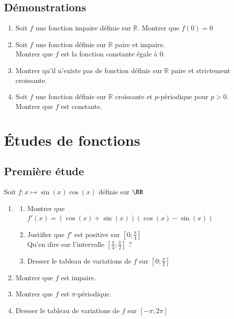 \documentclass[oneside,12pt]{article}          %
\begin{document}
\subsection{Démonstrations}
\begin{enumerate}
    \item Soit $ f $ une fonction impaire définie sur $ \mathbb{R} $. Montrer que $ f(0) = 0 $
    \item Soit $ f $ une fonction définie sur $ \mathbb{R} $ paire et impaire.\\
    Montrer que $ f $ est la fonction constante égale à 0.
    \item Montrer qu'il n'existe pas de fonction définie sur $ \mathbb{R} $ paire et strictement croissante.
    \item Soit $ f $ une fonction définie sur $ \mathbb{R} $ croissante et $ p $-périodique pour $ p > 0 $.\\
    Montrer que $ f $ est constante.
\end{enumerate}



\section{Études de fonctions}

\subsection{Première étude}
Soit $f:x\mapsto\sin(x)\cos(x)$ définie sur $\RR$
\begin{enumerate}
    \item \begin{enumerate}
        \item Montrer que $f'(x)=(\cos(x)+\sin(x))(\cos(x)-\sin(x))$
        \item Justifier que $f'$ est positive sur $[0;\frac{\pi}{4}]$\\
        Qu'en dire sur l'intervalle $[\frac{\pi}{4};\frac{\pi}{2}]$ ?
        \item Dresser le tableau de variations de $f$ sur $[0;\frac{\pi}{2}]$
    \end{enumerate}
    \item Montrer que $f$ est impaire.
    \item Montrer que $f$ est $\pi$-périodique.
    \item Dresser le tableau de variations de $f$ sur $[-\pi;2\pi]$
\end{enumerate}
\end{document}
